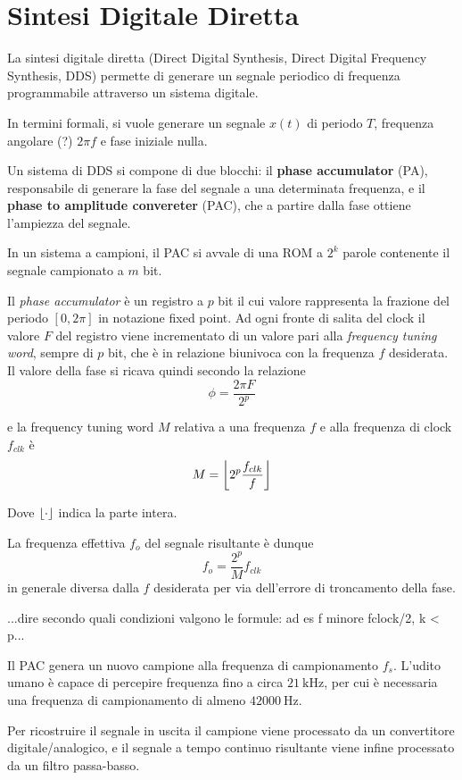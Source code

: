 \DeclarePairedDelimiter\floor{\lfloor}{\rfloor}

\chapter{Sintesi Digitale Diretta}

La sintesi digitale diretta (Direct Digital Synthesis, Direct Digital Frequency Synthesis, DDS) permette di generare un segnale periodico di frequenza programmabile attraverso un sistema digitale.

In termini formali, si vuole generare un segnale $x(t)$ di periodo $T$, frequenza angolare (?) $2\pi f$ e fase iniziale nulla.

Un sistema di DDS si compone di due blocchi: il \textbf{phase accumulator} (PA), responsabile di generare la fase del segnale a una determinata frequenza, e il \textbf{phase to amplitude convereter} (PAC), che a partire dalla fase ottiene l'ampiezza del segnale.

In un sistema a campioni, il PAC si avvale di una ROM a $2^{k}$ parole contenente il segnale campionato a $m$ bit.

Il \textit{phase accumulator} è un registro a $p$ bit il cui valore rappresenta la frazione del periodo $[0, 2\pi]$ in notazione fixed point. Ad ogni fronte di salita del clock il valore $F$ del registro viene incrementato di un valore pari alla \textit{frequency tuning word}, sempre di $p$ bit, che è in relazione biunivoca con la frequenza $f$ desiderata.
Il valore della fase si ricava quindi secondo la relazione
\[
\phi = \frac{2\pi F}{2^p}
\]

e la frequency tuning word $M$ relativa a una frequenza $f$ e alla frequenza di clock $f_{clk}$ è
\[
M = \floor*{2^p\frac{f_{clk}}{f}}
\]

Dove $\floor{\cdot}$ indica la parte intera.

La frequenza effettiva $f_{o}$ del segnale risultante è dunque
\[
f_{o} = \frac{2^p}{M} f_{clk}
\]
in generale diversa dalla $f$ desiderata per via dell'errore di troncamento della fase.

...dire secondo quali condizioni valgono le formule: ad es f minore fclock/2, k < p...

Il PAC genera un nuovo campione alla frequenza di campionamento $f_s$.
L'udito umano è capace di percepire frequenza fino a circa $\SI{21}{\kilo\hertz}$, per cui è necessaria una frequenza di campionamento di almeno $\SI{42000}{\hertz}$.

Per ricostruire il segnale in uscita il campione viene processato da un convertitore digitale/analogico, e il segnale a tempo continuo risultante viene infine processato da un filtro passa-basso.


